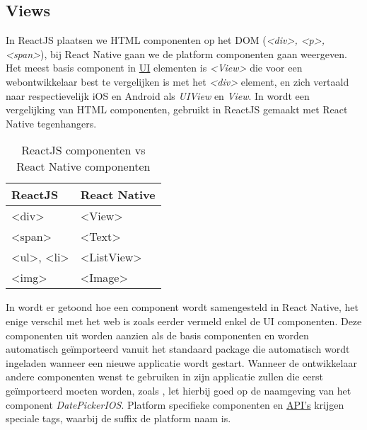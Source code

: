 \subsection{Views}
 In ReactJS plaatsen we HTML componenten op het DOM (\emph{<div>, <p>, <span>}), bij React Native gaan we de platform componenten gaan weergeven. Het meest basis component in \hyperref[ui]{UI} elementen is \emph{<View>} die voor een webontwikkelaar best te vergelijken is met het \emph{<div>} element, en zich vertaald naar respectievelijk iOS en Android als \emph{UIView} en \emph{View}. 
In  wordt een vergelijking van HTML componenten, gebruikt in ReactJS gemaakt met React Native tegenhangers. 


\begin{table}
		\scriptsize
		\centering
\begin{tabular}{ ll }
  \toprule
ReactJS & React Native \\
  \midrule
<div>	&	<View> \\
<span> & <Text> \\
<ul>, <li> & <ListView> \\
<img> & <Image> \\
  \bottomrule
\end{tabular}
\caption{ReactJS componenten vs React Native componenten}
\label{table:componenten}
\end{table}

In   wordt er getoond hoe een component wordt samengesteld in React Native, het enige verschil met het web is zoals eerder vermeld enkel de UI componenten. Deze componenten uit  worden aanzien als de basis componenten en worden automatisch geïmporteerd vanuit het standaard package die automatisch wordt ingeladen wanneer een nieuwe applicatie wordt gestart. Wanneer de ontwikkelaar andere componenten wenst te gebruiken in zijn applicatie zullen die eerst geïmporteerd moeten worden, zoals , let hierbij goed op de naamgeving van het component \emph{DatePickerIOS}. Platform specifieke componenten en \hyperref[api]{API's} krijgen speciale tags, waarbij de suffix de platform naam is. 

